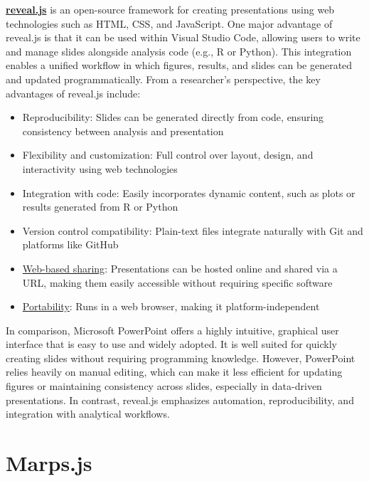 \documentclass[11pt]{article}
\begin{document}
\href{https://revealjs.com/}{\textbf{reveal.js}} is an open-source framework 
for creating presentations using web technologies such as HTML, CSS, and JavaScript. 
One major advantage of reveal.js is that it can be used within Visual Studio Code, 
allowing users to write and manage slides alongside analysis code (e.g., R or Python). 
This integration enables a unified workflow in which figures, results, and slides can 
be generated and updated programmatically.
From a researcher’s perspective, the key advantages of reveal.js include:
\begin{itemize}
\item Reproducibility: Slides can be generated directly from code, ensuring consistency between analysis and presentation
\item Flexibility and customization: Full control over layout, design, and interactivity using web technologies
\item Integration with code: Easily incorporates dynamic content, such as plots or results generated from R or Python
\item Version control compatibility: Plain-text files integrate naturally with Git and platforms like GitHub
\item \uline{Web-based sharing}: Presentations can be hosted online and shared via a URL, making them easily accessible without requiring specific software
\item \uline{Portability}: Runs in a web browser, making it platform-independent
\end{itemize}
In comparison, Microsoft PowerPoint offers a highly intuitive, 
graphical user interface that is easy to use and widely adopted. 
It is well suited for quickly creating slides without requiring programming knowledge. 
However, PowerPoint relies heavily on manual editing, 
which can make it less efficient for updating figures or maintaining consistency across slides, especially in data-driven presentations. 
In contrast, reveal.js emphasizes automation, reproducibility, and integration with analytical workflows.


\section{Marps.js}



\end{document}
